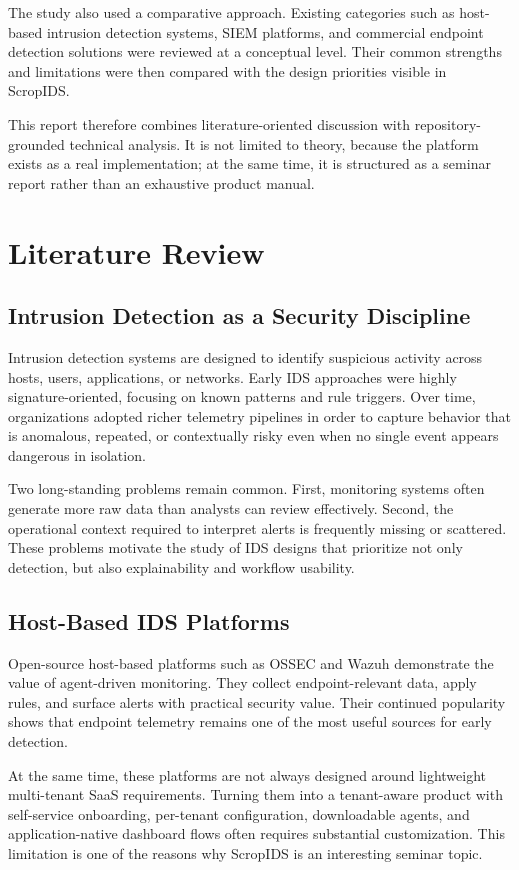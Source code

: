 \documentclass[12pt,a4paper]{report}
\begin{document}
The study also used a comparative approach. Existing categories such as host-based intrusion detection systems, SIEM platforms, and commercial endpoint detection solutions were reviewed at a conceptual level. Their common strengths and limitations were then compared with the design priorities visible in ScropIDS.

This report therefore combines literature-oriented discussion with repository-grounded technical analysis. It is not limited to theory, because the platform exists as a real implementation; at the same time, it is structured as a seminar report rather than an exhaustive product manual.

\chapter{Literature Review}

\section{Intrusion Detection as a Security Discipline}
Intrusion detection systems are designed to identify suspicious activity across hosts, users, applications, or networks. Early IDS approaches were highly signature-oriented, focusing on known patterns and rule triggers. Over time, organizations adopted richer telemetry pipelines in order to capture behavior that is anomalous, repeated, or contextually risky even when no single event appears dangerous in isolation.

Two long-standing problems remain common. First, monitoring systems often generate more raw data than analysts can review effectively. Second, the operational context required to interpret alerts is frequently missing or scattered. These problems motivate the study of IDS designs that prioritize not only detection, but also explainability and workflow usability.

\section{Host-Based IDS Platforms}
Open-source host-based platforms such as OSSEC and Wazuh demonstrate the value of agent-driven monitoring. They collect endpoint-relevant data, apply rules, and surface alerts with practical security value. Their continued popularity shows that endpoint telemetry remains one of the most useful sources for early detection.

At the same time, these platforms are not always designed around lightweight multi-tenant SaaS requirements. Turning them into a tenant-aware product with self-service onboarding, per-tenant configuration, downloadable agents, and application-native dashboard flows often requires substantial customization. This limitation is one of the reasons why ScropIDS is an interesting seminar topic.
\end{document}
